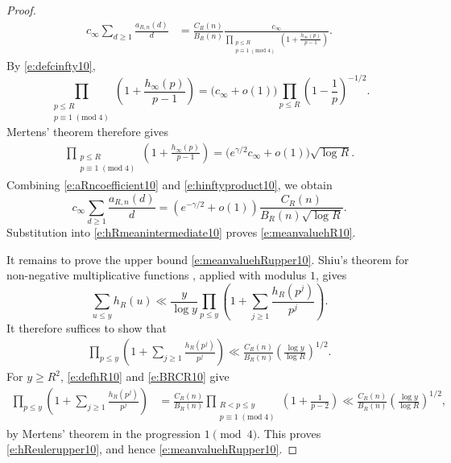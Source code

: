 \documentclass[12pt,reqno]{amsart}
\numberwithin{equation}{section}
\theoremstyle{definition}
\theoremstyle{remark}
\begin{document}
\begin{proof}
\begin{align}
 c_\infty\sum_{d\geq1}\frac{a_{R,n}(d)}d
 &=
 \frac{C_R(n)}{B_R(n)}
 \frac{c_\infty}
 {\displaystyle
  \prod_{\substack{p\leq R\\p\equiv1\;(\mathrm{mod}\;4)}}
  \left(1+\frac{h_\infty(p)}{p-1}\right)}.
\end{align}
By \eqref{e:defcinfty10},
\[
 \prod_{\substack{p\leq R\\p\equiv1\;(\mathrm{mod}\;4)}}
 \left(1+\frac{h_\infty(p)}{p-1}\right)
 =
 \bigl(c_\infty+o(1)\bigr)
 \prod_{p\leq R}\left(1-\frac1p\right)^{-1/2}.
\]
Mertens' theorem therefore gives
\begin{align}\label{e:hinftyproduct10}
 \prod_{\substack{p\leq R\\p\equiv1\;(\mathrm{mod}\;4)}}
 \left(1+\frac{h_\infty(p)}{p-1}\right)
 =
 \bigl(e^{\gamma/2}c_\infty+o(1)\bigr)\sqrt{\log R}.
\end{align}
Combining \eqref{e:aRncoefficient10} and
\eqref{e:hinftyproduct10}, we obtain
\[
 c_\infty\sum_{d\geq1}\frac{a_{R,n}(d)}d
 =
 \left(e^{-\gamma/2}+o(1)\right)
 \frac{C_R(n)}{B_R(n)\sqrt{\log R}}.
\]
Substitution into \eqref{e:hRmeanintermediate10} proves
\eqref{e:meanvaluehR10}.

It remains to prove the upper bound
\eqref{e:meanvaluehRupper10}.  Shiu's theorem for non-negative
multiplicative functions \cite[Theorem~1]{Shiu}, applied with modulus
\(1\), gives
\[
 \sum_{u\leq y}h_R(u)
 \ll
 \frac{y}{\log y}
 \prod_{p\leq y}
 \left(1+\sum_{j\geq1}\frac{h_R(p^j)}{p^j}\right).
\]
It therefore suffices to show that
\begin{align}\label{e:hReulerupper10}
 \prod_{p\leq y}
 \left(1+\sum_{j\geq1}\frac{h_R(p^j)}{p^j}\right)
 \ll
 \frac{C_R(n)}{B_R(n)}
 \left(\frac{\log y}{\log R}\right)^{1/2}.
\end{align}
For \(y\geq R^2\), \eqref{e:defhR10} and \eqref{e:BRCR10} give
\begin{align*}
 \prod_{p\leq y}
 \left(1+\sum_{j\geq1}\frac{h_R(p^j)}{p^j}\right)
 &=
 \frac{C_R(n)}{B_R(n)}
 \prod_{\substack{R<p\leq y\\p\equiv1\;(\mathrm{mod}\;4)}}
 \left(1+\frac1{p-2}\right)\ll
 \frac{C_R(n)}{B_R(n)}
 \left(\frac{\log y}{\log R}\right)^{1/2},
\end{align*}
by Mertens' theorem in the progression \(1\pmod4\).  This proves
\eqref{e:hReulerupper10}, and hence
\eqref{e:meanvaluehRupper10}.


\end{proof}
\end{document}
